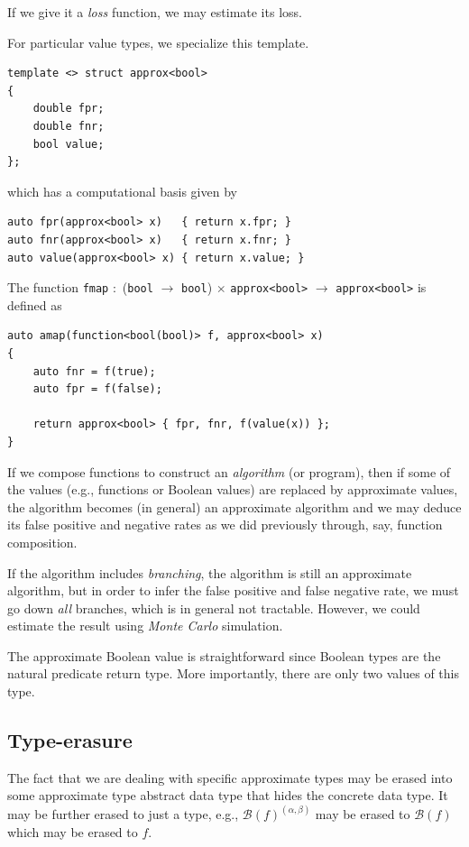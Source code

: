 \documentclass[11pt,final,hidelinks]{article}
\newcommand{\FPR}{\alpha}          %
\newcommand{\FNR}{\beta}           %
\newcommand{\Ber}[1]{\mathcal{B}(#1)}  %
\theoremstyle{plain}
\begin{document}
If we give it a \emph{loss} function, we may estimate its loss.

For particular value types, we specialize this template.
\begin{lstlisting}
template <> struct approx<bool>
{
    double fpr;
    double fnr;
    bool value;
};
\end{lstlisting}
which has a computational basis given by
\begin{lstlisting}
auto fpr(approx<bool> x)   { return x.fpr; }
auto fnr(approx<bool> x)   { return x.fnr; }
auto value(approx<bool> x) { return x.value; }
\end{lstlisting}

The function \lstinline{fmap} $:$ (\lstinline{bool} $\to$ \lstinline{bool}) $\times$ \lstinline{approx<bool>} $\to$ \lstinline{approx<bool>} is defined as
\begin{lstlisting}
auto amap(function<bool(bool)> f, approx<bool> x)
{
    auto fnr = f(true);
    auto fpr = f(false);

    return approx<bool> { fpr, fnr, f(value(x)) };
}
\end{lstlisting}

If we compose functions to construct an \emph{algorithm} (or program), then if some of the values (e.g., functions or Boolean values) are replaced by approximate values, the algorithm becomes (in general) an approximate algorithm and we may deduce its false positive and negative rates as we did previously through, say, function composition.

If the algorithm includes \emph{branching}, the algorithm is still an approximate algorithm, but in order to infer the false positive and false negative rate, we must go down \emph{all} branches, which is in general not tractable.
However, we could estimate the result using \emph{Monte Carlo} simulation.

The approximate Boolean value is straightforward since Boolean types are the natural predicate return type.
More importantly, there are only two values of this type.

\subsection{Type-erasure}
The fact that we are dealing with specific approximate types may be erased into some approximate type abstract data type that hides the concrete data type.
It may be further erased to just a type, e.g., $\Ber{f}^{(\FPR,\FNR)}$ may be erased to $\Ber{f}$ which may be erased to $f$.
\end{document}
